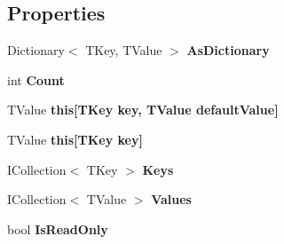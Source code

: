 \subsection*{Properties}
\begin{DoxyCompactItemize}
\item 
Dictionary$<$ T\+Key, T\+Value $>$ {\bfseries As\+Dictionary}\hypertarget{class_serializable_dictionary_ae42159a109bcf59934d1008be8fd2664}{}\label{class_serializable_dictionary_ae42159a109bcf59934d1008be8fd2664}

\item 
int {\bfseries Count}\hypertarget{class_serializable_dictionary_ab52264e68299b050752a050e7acf439c}{}\label{class_serializable_dictionary_ab52264e68299b050752a050e7acf439c}

\item 
T\+Value {\bfseries this\mbox{[}\+T\+Key key, T\+Value default\+Value\mbox{]}}\hypertarget{class_serializable_dictionary_add168e66d6682655c6ba788a469e3d83}{}\label{class_serializable_dictionary_add168e66d6682655c6ba788a469e3d83}

\item 
T\+Value {\bfseries this\mbox{[}\+T\+Key key\mbox{]}}\hypertarget{class_serializable_dictionary_ae439a2e72e69cdbfe74ee0ef326022b7}{}\label{class_serializable_dictionary_ae439a2e72e69cdbfe74ee0ef326022b7}

\item 
I\+Collection$<$ T\+Key $>$ {\bfseries Keys}\hypertarget{class_serializable_dictionary_a2e6f3c3f3f9cca281e20ebecd6bbc9dd}{}\label{class_serializable_dictionary_a2e6f3c3f3f9cca281e20ebecd6bbc9dd}

\item 
I\+Collection$<$ T\+Value $>$ {\bfseries Values}\hypertarget{class_serializable_dictionary_a66b3af338ff68456c5f5d786de11b1a2}{}\label{class_serializable_dictionary_a66b3af338ff68456c5f5d786de11b1a2}

\item 
bool {\bfseries Is\+Read\+Only}\hypertarget{class_serializable_dictionary_ae32c91953d3e4741b7b2b703b2f88d09}{}\label{class_serializable_dictionary_ae32c91953d3e4741b7b2b703b2f88d09}

\end{DoxyCompactItemize}
